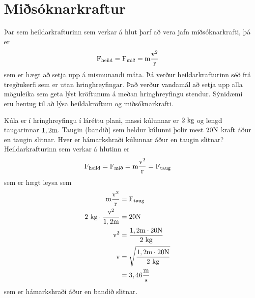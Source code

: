 \section{Miðsóknarkraftur}
Þar sem heildarkrafturinn sem verkar á hlut þarf að vera jafn miðsóknarkrafti, 
þá er
\begin{equation}
	\textrm{F}_\text{heild} = \textrm{F}_\text{mið} = \textrm{m} \frac{\textrm{v}^2}{\textrm{r}}
\end{equation}
sem er hægt að setja upp á mismunandi máta. Þá verður heildarkrafturinn séð frá
tregðukerfi sem er utan hringhreyfingar. Það verður vandamál að setja upp
alla möguleika sem geta lýst kröftunum á meðan hringhreyfingu stendur. Sýnidæmi
eru hentug til að lýsa heildakröftum og miðsóknarkrafti.
\begin{formalexample}
Kúla er í hringhreyfingu í láréttu plani, massi kúlunnar er $2 \textrm{ k}\textrm{g}$ og
lengd taugarinnar $1,2 \textrm{m}$.
Taugin (bandið) sem heldur kúlunni þolir mest $20 \textrm{N}$ kraft áður en taugin
slitnar. Hver er hámarkshraði kúlunnar áður en taugin slitnar?
\\[4 ex]
Heildarkrafturinn sem verkar á hlutinn er
\[
	\textrm{F}_\text{heild} 
		= \textrm{F}_\text{mið} 
		= \textrm{m} \frac{\textrm{v}^2}{\textrm{r}}
		= \textrm{F}_\text{taug}
\]
sem er hægt leysa sem
\begin{align*}
	\textrm{m} \frac{\textrm{v}^2}{\textrm{r}} &= 
		\textrm{F}_\text{taug}\\
	2 \textrm{ k}\textrm{g} \cdot \frac{\textrm{v}^2}{1,2 \textrm{m}} &= 
		20 \textrm{N}\\
	\textrm{v}^2 &= 
		\frac{1,2 \textrm{m} \cdot 20 \textrm{N} }{ 2 \textrm{ k}\textrm{g} }\\
	\textrm{v} &= 
		\sqrt{ \frac{1,2 \textrm{m} \cdot 20 \textrm{N} }{ 2 \textrm{ k}\textrm{g} } }\\
	 &= 
		3,46 \frac{\textrm{m}}{\textrm{s}}
\end{align*}
sem er hámarkshraði áður en bandið slitnar.
\end{formalexample}
